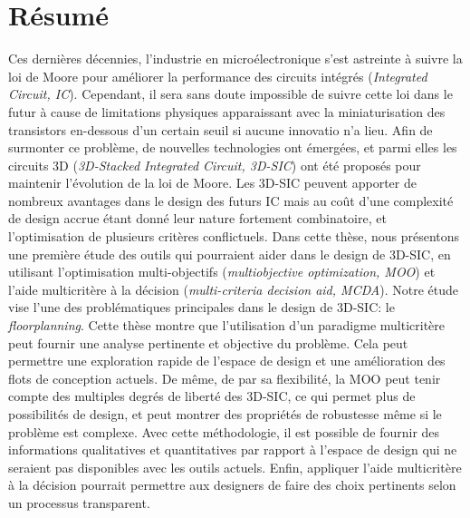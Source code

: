 \chapter[R\'esum\'e (French Summary)]{R\'esum\'e}

\vspace{-0.5in}

Ces dernières décennies, l'industrie en microélectronique s'est astreinte à suivre la loi de Moore pour améliorer la performance des circuits intégrés (\textit{Integrated Circuit, IC}). Cependant, il sera sans doute impossible de suivre cette loi dans le futur à cause de limitations physiques apparaissant avec la miniaturisation des transistors en-dessous d'un certain seuil si aucune innovatio n'a lieu. Afin de surmonter ce problème, de nouvelles technologies ont émergées, et parmi elles les circuits 3D (\textit{3D-Stacked Integrated Circuit, 3D-SIC}) ont été proposés pour maintenir l'évolution de la loi de Moore. Les 3D-SIC peuvent apporter de nombreux avantages dans le design des futurs IC mais au coût d'une complexité de design accrue étant donné leur nature fortement combinatoire, et l'optimisation de plusieurs critères conflictuels. Dans cette thèse, nous présentons une première étude des outils qui pourraient aider dans le design de 3D-SIC, en utilisant l'optimisation multi-objectifs (\textit{multiobjective optimization, MOO}) et l'aide multicritère à la décision (\textit{multi-criteria decision aid, MCDA}). Notre étude vise l'une des problématiques principales dans le design de 3D-SIC: le \textit{floorplanning}. Cette thèse montre que l'utilisation d'un paradigme multicritère peut fournir une analyse pertinente et objective du problème. Cela peut permettre une exploration rapide de l'espace de design et une amélioration des flots de conception actuels. De même, de par sa flexibilité, la MOO peut tenir compte des multiples degrés de liberté des 3D-SIC, ce qui permet plus de possibilités de design, et peut montrer des propriétés de robustesse même si le problème est complexe. Avec cette méthodologie, il est possible de fournir des informations qualitatives et quantitatives par rapport à l'espace de design qui ne seraient pas disponibles avec les outils actuels. Enfin, appliquer l'aide multicritère à la décision pourrait permettre aux designers de faire des choix pertinents selon un processus transparent.